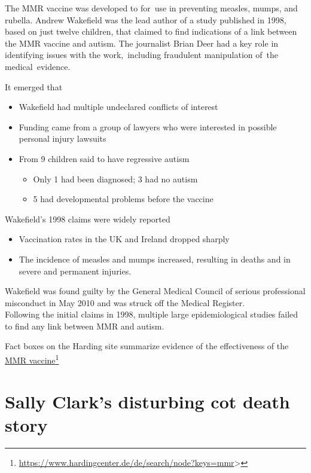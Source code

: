 \documentclass[
  10pt,
  b5paper]{book}
\providecommand{\tightlist}{%
  \setlength{\itemsep}{0pt}\setlength{\parskip}{0pt}}
\begin{document}
The MMR vaccine was developed to for~use in preventing measles,
mumps, and rubella. Andrew Wakefield was the lead author of a
study published in 1998, based on just twelve children, that
claimed to find indications of a link between the MMR vaccine
and autism. The journalist Brian Deer had a key role in
identifying issues with the work,~including fraudulent
manipulation of~the medical~evidence.

It emerged that

\begin{itemize}
\tightlist
\item
  Wakefield had multiple undeclared conflicts of interest
\item
  Funding came from a group of lawyers who were interested
  in possible personal injury lawsuits
\item
  From 9 children said to have regressive autism

  \begin{itemize}
  \tightlist
  \item
    Only 1 had been diagnosed; 3 had no autism\\
  \item
    5 had developmental problems before the vaccine
  \end{itemize}
\end{itemize}

Wakefield's 1998 claims were widely reported

\begin{itemize}
\tightlist
\item
  Vaccination rates in the UK and Ireland dropped sharply
\item
  The incidence of measles and mumps increased, resulting
  in deaths and in severe and permanent injuries.
\end{itemize}

Wakefield was found guilty by the General Medical Council of serious professional misconduct in May 2010 and was struck off the Medical Register.\\
Following the initial claims in 1998, multiple large epidemiological studies failed to find any link between MMR and autism.

Fact boxes on the Harding site summarize evidence of the
effectiveness of the \href{https://www.hardingcenter.de/de/search/node?keys=mmr}{MMR vaccine}\footnote{\url{https://www.hardingcenter.de/de/search/node?keys=mmr}\textgreater{}}

\hypertarget{sally-clarks-disturbing-cot-death-story}{%
\section{Sally Clark's disturbing cot death story}\label{sally-clarks-disturbing-cot-death-story}}
\end{document}
